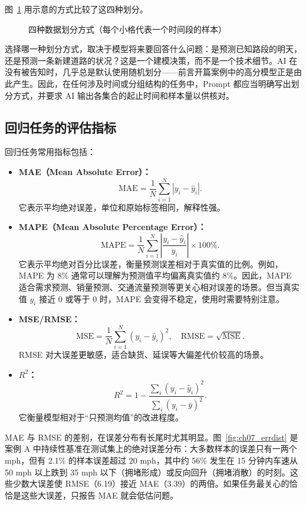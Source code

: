 图~\ref{fig:ch07_splits} 用示意的方式比较了这四种划分。

\begin{figure}[H]
  \centering
  \caption{四种数据划分方式（每个小格代表一个时间段的样本）}
  \label{fig:ch07_splits}
\end{figure}

选择哪一种划分方式，取决于模型将来要回答什么问题：是预测已知路段的明天，还是预测一条新建道路的状况？这是一个建模决策，而不是一个技术细节。AI 在没有被告知时，几乎总是默认使用随机划分——前言开篇案例中的高分模型正是由此产生。因此，在任何涉及时间或分组结构的任务中，Prompt 都应当明确写出划分方式，并要求 AI 输出各集合的起止时间和样本量以供核对。

\subsection{回归任务的评估指标}

回归任务常用指标包括：
\begin{itemize}
    \item \textbf{MAE（Mean Absolute Error）：}
    \[
    \mathrm{MAE}=\frac{1}{N}\sum_{i=1}^{N}|y_i-\hat{y}_i|.
    \]
    它表示平均绝对误差，单位和原始标签相同，解释性强。
    \item \textbf{MAPE（Mean Absolute Percentage Error）：}
    \[
    \mathrm{MAPE}=\frac{1}{N}\sum_{i=1}^{N}\left|\frac{y_i-\hat{y}_i}{y_i}\right|\times 100\%.
    \]
    它表示平均绝对百分比误差，衡量预测误差相对于真实值的比例。例如，MAPE 为 $8\%$ 通常可以理解为预测值平均偏离真实值约 $8\%$。因此，MAPE 适合需求预测、销量预测、交通流量预测等更关心相对误差的场景。但当真实值 $y_i$ 接近 0 或等于 0 时，MAPE 会变得不稳定，使用时需要特别注意。
    \item \textbf{MSE/RMSE：}
    \[
    \mathrm{MSE}=\frac{1}{N}\sum_{i=1}^{N}(y_i-\hat{y}_i)^2,\quad
    \mathrm{RMSE}=\sqrt{\mathrm{MSE}}.
    \]
    RMSE 对大误差更敏感，适合缺货、延误等大偏差代价较高的场景。
    \item \textbf{$R^2$：}
    \[
    R^2=1-\frac{\sum_i(y_i-\hat{y}_i)^2}{\sum_i(y_i-\bar{y})^2}.
    \]
    它衡量模型相对于“只预测均值”的改进程度。
\end{itemize}

MAE 与 RMSE 的差别，在误差分布有长尾时尤其明显。图~\ref{fig:ch07_errdist} 是案例 A 中持续性基准在测试集上的绝对误差分布：大多数样本的误差只有一两个 mph，但有 2.1\% 的样本误差超过 20 mph，其中约 56\% 发生在 15 分钟内车速从 50 mph 以上跌到 35 mph 以下（拥堵形成）或反向回升（拥堵消散）的时刻。这些少数大误差使 RMSE（6.19）接近 MAE（3.39）的两倍。如果任务最关心的恰恰是这些大误差，只报告 MAE 就会低估问题。


